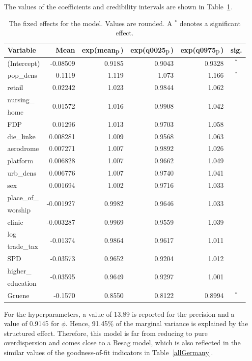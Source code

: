%     
The values of the coefficients and credibility intervals are shown in Table~\ref{FixedAllGermany_spatial}.
\begin{table}[H]
\caption{The fixed effects for the model. Values are rounded. A $^*$ denotes a significant effect. \label{FixedAllGermany_spatial}}
\begin{tabular}{l r r r r c}
\toprule
\textbf{Variable}	& \textbf{Mean}	& \textbf{exp(mean$_{\hbox{p}}$)} & \textbf{exp(q0025$_{\hbox{p}}$)} & \textbf{exp(q0975$_{\hbox{p}}$)} & \textbf{sig.}\\
\midrule
(Intercept) & -0.08509 & 0.9185 & 0.9043 & 0.9328 & $^*$\\
pop\_dens & 0.1119 & 1.119 & 1.073 & 1.166 & $^*$\\
retail & 0.02242 & 1.023 & 0.9844 & 1.062 \\
nursing\_ & \multirow{2}{*}{0.01572} & \multirow{2}{*}{1.016} & \multirow{2}{*}{0.9908} & \multirow{2}{*}{1.042} \\
home \\
FDP & 0.01296 & 1.013 & 0.9703 & 1.058 &\\
die\_linke & 0.008281 & 1.009 & 0.9568 & 1.063\\
aerodrome & 0.007271 & 1.007 & 0.9892 & 1.026 \\
platform & 0.006828 & 1.007 & 0.9662 & 1.049 \\
urb\_dens & 0.006776 & 1.007 & 0.9740 & 1.041 \\
sex & 0.001694 & 1.002 & 0.9716 & 1.033 &\\
place\_of\_ & \multirow{2}{*}{-0.001927} & \multirow{2}{*}{0.9982} & \multirow{2}{*}{0.9646} & \multirow{2}{*}{1.033} \\
worship \\
clinic & -0.003287 & 0.9969 & 0.9559 & 1.039 \\
log & \multirow{2}{*}{-0.01374} & \multirow{2}{*}{0.9864} & \multirow{2}{*}{0.9617} & \multirow{2}{*}{1.011}\\
trade\_tax \\
SPD & -0.03573 & 0.9652 & 0.9204 & 1.012 \\
higher\_ & \multirow{2}{*}{-0.03595} & \multirow{2}{*}{0.9649} & \multirow{2}{*}{0.9297} & \multirow{2}{*}{1.001} \\
education \\
Gruene & -0.1570 & 0.8550 & 0.8122 & 0.8994 & $^*$\\
\bottomrule
\end{tabular}
\end{table}
For the hyperparameters, a value of 13.89 is reported for the precision and a value of 0.9145 for $\phi$. Hence, 91.45\% of the marginal variance is explained by the structured effect. Therefore, this model is far from reducing to pure overdispersion and comes close to a Besag model, which is also reflected in the similar values of the goodness-of-fit indicators in Table~\ref{allGermany}.
